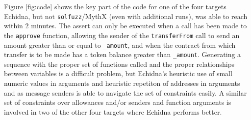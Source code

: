 Figure \ref{fig:code} shows the key part of the code for one of the four targets Echidna, but not {\tt solfuzz}/MythX (even with additional runs), was able to reach within 2 minutes.  The assert can only be executed when a call has been made to the {\tt approve} function, allowing the sender of the {\tt transferFrom} call to send an amount greater than or equal to {\tt \_amount}, and when  the contract from which transfer is to be made has a token balance greater than {\tt \_amount}.  Generating a sequence with the proper set of functions called and the proper relationships between variables is a difficult problem, but Echidna's heuristic use of small numeric values in arguments and heuristic repetiton of addresses in arguments and as message senders is able to navigate the set of constraints easily.  A similar set of constraints over allowances and/or senders and function arguments is involved in two of the other four targets where Echidna performs better.



